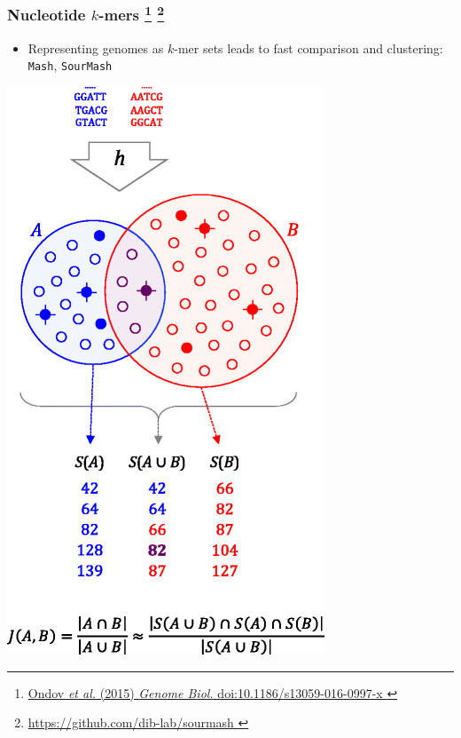 %
\begin{frame}
  \frametitle{Nucleotide $k$-mers
  \footnote{\tiny{\href{http://dx.doi.org/10.1007/s13199-012-0154-6
}{Ondov \textit{et al.} (2015) \textit{Genome Biol.} doi:10.1186/s13059-016-0997-x
}}}
  \footnote{\tiny{\href{https://github.com/dib-lab/sourmash
}{https://github.com/dib-lab/sourmash
}}}  
}
  \begin{itemize}
    \item \textcolor{hutton_green}{Representing genomes as $k$-mer sets leads to fast comparison and clustering: \texttt{Mash}, \texttt{SourMash}}    
  \end{itemize}  
  \begin{center}
    \includegraphics[height=0.6\textheight]{images/mash_sets}

\end{center}
\end{frame}
